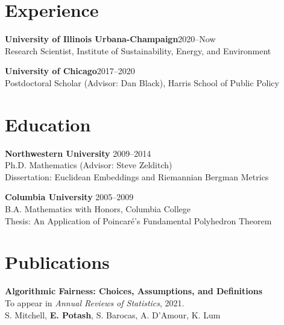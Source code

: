 \documentclass[margin,line]{resume}
\begin{document}
\address{eric@k2co3.net / \href{http://www.k2co3.net}{k2co3.net} / \href{https://github.com/potash}{github.com/potash}}
\begin{resume}
\section{\mysidestyle Experience}

	{\bf University of Illinois Urbana-Champaign}\hfill{2020--Now}\\
	Research Scientist, Institute of Sustainability, Energy, and Environment

	{\bf University of Chicago}\hfill{2017--2020}\\
	Postdoctoral Scholar (Advisor: Dan Black), Harris School of Public Policy

    \section{\mysidestyle Education}
	
	{\bf Northwestern University} \hfill {2009--2014} \\%
	Ph.D. Mathematics (Advisor: Steve Zelditch) \\
	Dissertation: Euclidean Embeddings and Riemannian Bergman Metrics

	{\bf Columbia University} \hfill {2005--2009} \\%
    B.A. Mathematics with Honors, Columbia College \\
	Thesis: An Application of Poincar\'e's Fundamental Polyhedron Theorem

	
	\section{\mysidestyle Publications}
        {\bf Algorithmic Fairness: Choices, Assumptions, and Definitions}\\
        To appear in \textit{Annual Reviews of Statistics}, 2021.\\
        S. Mitchell, \textbf{E. Potash}, S. Barocas, A. D'Amour, K. Lum


\end{resume}
\end{document}

